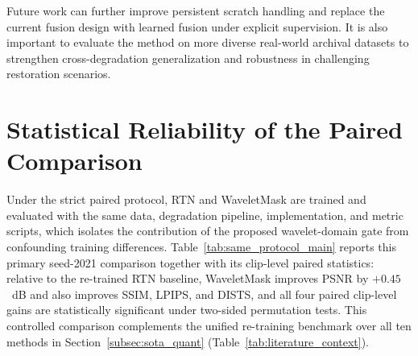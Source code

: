 {Future work can further improve persistent scratch handling and replace the current fusion design with learned fusion under explicit supervision. It is also important to evaluate the method on more diverse real-world archival datasets to strengthen cross-degradation generalization and robustness in challenging restoration scenarios.


\section{Statistical Reliability of the Paired Comparison}\label{app:stats}

Under the strict paired protocol, RTN and WaveletMask are trained and evaluated with the same data, degradation pipeline, implementation, and metric scripts, which isolates the contribution of the proposed wavelet-domain gate from confounding training differences. Table~\ref{tab:same_protocol_main} reports this primary seed-2021 comparison together with its clip-level paired statistics: relative to the re-trained RTN baseline, WaveletMask improves PSNR by $+0.45$~dB and also improves SSIM, LPIPS, and DISTS, and all four paired clip-level gains are statistically significant under two-sided permutation tests. This controlled comparison complements the unified re-training benchmark over all ten methods in Section~\ref{subsec:sota_quant} (Table~\ref{tab:literature_context}).

}
